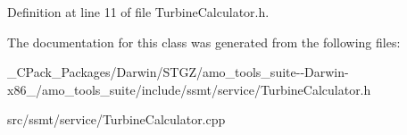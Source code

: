 Definition at line 11 of file Turbine\+Calculator.\+h.



The documentation for this class was generated from the following files\+:\begin{DoxyCompactItemize}
\item 
\+\_\+\+C\+Pack\+\_\+\+Packages/\+Darwin/\+S\+T\+G\+Z/amo\+\_\+tools\+\_\+suite-\/-\/\+Darwin-\/x86\+\_/amo\+\_\+tools\+\_\+suite/include/ssmt/service/Turbine\+Calculator.\+h\item 
src/ssmt/service/Turbine\+Calculator.\+cpp\end{DoxyCompactItemize}
